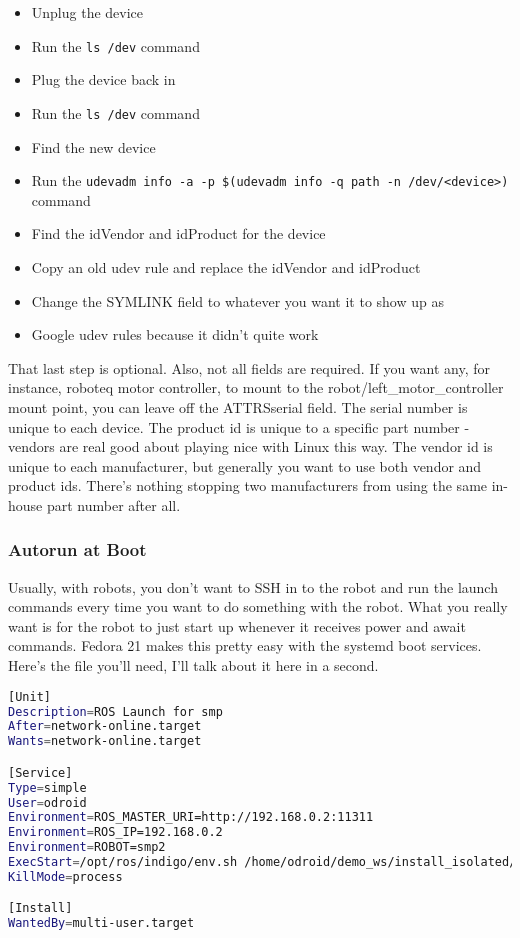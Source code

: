 \begin{itemize}
\item{Unplug the device}
\item{Run the \lstinline{ls /dev} command}\lstinline{}
\item{Plug the device back in}
\item{Run the \lstinline{ls /dev} command}\lstinline{}
\item{Find the new device}
\item{Run the \lstinline{udevadm info -a -p $(udevadm info -q path -n /dev/<device>)} command}\lstinline{}
\item{Find the idVendor and idProduct for the device}
\item{Copy an old udev rule and replace the idVendor and idProduct}
\item{Change the SYMLINK field to whatever you want it to show up as}
\item{Google udev rules because it didn't quite work}
\end{itemize}

That last step is optional. Also, not all fields are required. If you want any, for instance, roboteq motor controller, to mount to the robot/left\_motor\_controller mount point, you can leave off the ATTRS{serial} field. The serial number is unique to each device. The product id is unique to a specific part number - vendors are real good about playing nice with Linux this way. The vendor id is unique to each manufacturer, but generally you want to use both vendor and product ids. There's nothing stopping two manufacturers from using the same in-house part number after all.

\subsubsection{Autorun at Boot}
\label{sec:autorunatboot}
Usually, with robots, you don't want to SSH in to the robot and run the launch commands every time you want to do something with the robot. What you really want is for the robot to just start up whenever it receives power and await commands. Fedora 21 makes this pretty easy with the systemd boot services. Here's the file you'll need, I'll talk about it here in a second.

\begin{lstlisting}[language=bash,caption=SMP Bringup Service,label=lst:smpbringup.service,breaklines=true]
[Unit]
Description=ROS Launch for smp
After=network-online.target
Wants=network-online.target

[Service]
Type=simple
User=odroid
Environment=ROS_MASTER_URI=http://192.168.0.2:11311
Environment=ROS_IP=192.168.0.2
Environment=ROBOT=smp2
ExecStart=/opt/ros/indigo/env.sh /home/odroid/demo_ws/install_isolated/env.sh roslaunch smp_bringup smp.launch --wait
KillMode=process

[Install]
WantedBy=multi-user.target
\end{lstlisting}

